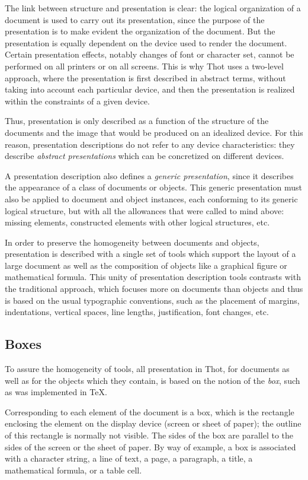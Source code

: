 The link between structure and presentation is clear: the logical
organization of a document is used to carry out its presentation,
since the purpose of the presentation is to make evident the
organization of the document.  But the presentation is equally
dependent on the device used to render the document.  Certain
presentation effects, notably changes of font or character set, cannot
be performed on all printers or on all screens.  This is why Thot uses
a two-level approach, where the presentation is first described in
abstract terms, without taking into account each particular device,
and then the presentation is realized within the constraints of a
given device.

Thus, presentation is only described as a function of the structure of
the documents and the image that would be produced on an idealized
device.  For this reason, presentation descriptions do not refer to
any device characteristics: they describe {\em abstract presentations}
which can be concretized on different devices.

A presentation description also defines a {\em generic presentation},
since it describes the appearance of a class of documents or objects.
This generic presentation must also be applied to document and object
instances, each conforming to its generic logical structure, but with
all the allowances that were called to mind above: missing elements,
constructed elements with other logical structures, etc.

In order to preserve the homogeneity between documents and objects,
presentation is described with a single set of tools which support the
layout of a large document as well as the composition of objects like
a graphical figure or mathematical formula.  This unity of
presentation description tools contrasts with the traditional
approach, which focuses more on documents than objects and thus is
based on the usual typographic conventions, such as the placement of
margins, indentations, vertical spaces, line lengths, justification,
font changes, etc.

\subsection{Boxes}

To assure the homogeneity of tools, all presentation in Thot, for
documents as well as for the objects which they contain, is based on
the notion of the {\em box}, such as was implemented in {\TeX}.

Corresponding to each element of the document is a box,  which is the
rectangle enclosing the element on the display device (screen or sheet
of paper);  the outline of this rectangle is normally not visible.
The sides of the box are parallel to the sides of the screen or the
sheet of paper.  By way of example, a box is associated with a
character string, a line of text, a page, a paragraph, a title, a
mathematical formula, or a table cell.

